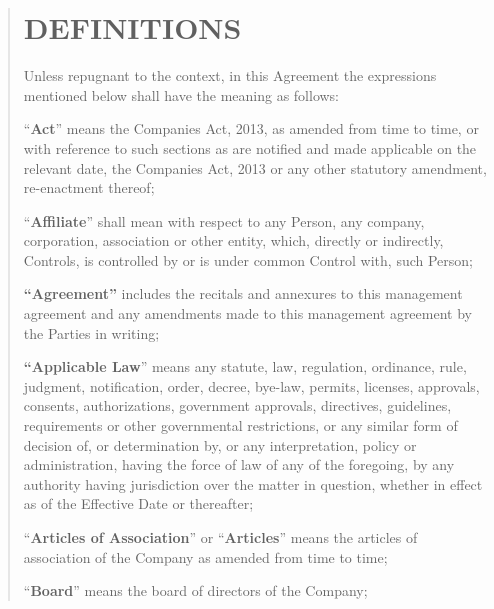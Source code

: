 \documentclass[
]{article}
\begin{document}
\begin{quote}
\section{DEFINITIONS}

Unless repugnant to the context, in this Agreement the expressions
mentioned below shall have the meaning as follows:

``\textbf{Act}'' means the Companies Act, 2013, as amended from time to
time, or with reference to such sections as are notified and made
applicable on the relevant date, the Companies Act, 2013 or any other
statutory amendment, re-enactment thereof;

``\textbf{Affiliate}'' shall mean with respect to any Person, any
company, corporation, association or other entity, which, directly or
indirectly, Controls, is controlled by or is under common Control with,
such Person;

\textbf{``Agreement''} includes the recitals and annexures to this
management agreement and any amendments made to this management
agreement by the Parties in writing;

\textbf{``Applicable Law}'' means any statute, law, regulation,
ordinance, rule, judgment, notification, order, decree, bye-law,
permits, licenses, approvals, consents, authorizations, government
approvals, directives, guidelines, requirements or other governmental
restrictions, or any similar form of decision of, or determination by,
or any interpretation, policy or administration, having the force of law
of any of the foregoing, by any authority having jurisdiction over the
matter in question, whether in effect as of the Effective Date or
thereafter;

``\textbf{Articles of Association}'' or ``\textbf{Articles}'' means the
articles of association of the Company as amended from time to time;

``\textbf{Board}'' means the board of directors of the Company;
\end{quote}
\end{document}
